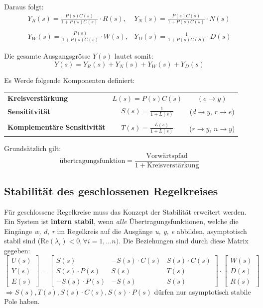     Daraus folgt: 
    \[\begin{matrix}
    Y_R(s) = \frac{P(s)C(s)}{1+P(s)C(s)}\cdot R(s), & Y_N(s) = \frac{P(s)C(s)}{1+P(s)C(s)}\cdot N(s) \\
    &\\
    Y_W(s) = \frac{P(s)}{1+P(s)C(s)}\cdot W(s), &
    Y_D(s) =  \frac{1}{1+P(s)C(S)}\cdot D(s)  

    \end{matrix}\]
    
    Die gesamte Ausgangsgrösse $Y(s)$ lautet somit:
    \[
    Y(s) = Y_R(s) + Y_N(s)+Y_W(s)+ Y_D(s)
    \]
    
    Es Werde folgende Komponenten definiert:
    
    {\renewcommand{\arraystretch}{1.5}
    \begin{tabular}{l|c|c}
    
    \textbf{Kreisverstärkung}    &$L(s)=P(s) C(s)$   & $(e\rightarrow y)$ \\
     \textbf{Sensititvität}  & $S(s) = \frac{1}{1+L(s)}$  & ($d\rightarrow y$, $r\rightarrow e$)   \\ 
     \multirow{2}{10em}{
      \textbf{Komplementäre} \textbf{Sensitivität}} & &\\& $T(s) = \frac{L(s)}{1+L(s)}$ &($r\rightarrow y$, $n\rightarrow y$)
      
        
    \end{tabular}
    }
    Grundsätzlich gilt: \[\textrm{übertragungsfunktion}=\frac{\textrm{Vorwärtspfad}}{1+\textrm{Kreisverstärkung}}\]
    
    \subsection{Stabilität des geschlossenen Regelkreises}
        Für geschlossene Regelkreise muss das Konzept der Stabilität erweitert werden. Ein System ist \textbf{intern stabil}, wenn \textit{alle} Übertragungsfunktionen, welche die Eingänge \textit{w, d, r} im Regelkreis auf die Ausgänge \textit{u, y, e} abbilden, asymptotisch stabil sind ($\textrm{Re}(\lambda_i)<0,\forall i=1,\dots n)$. Die Beziehungen sind durch diese Matrix gegeben:
        \[\begin{bmatrix}
        U(s)\\Y(s)\\E(s)
        \end{bmatrix}
        =
        \begin{bmatrix}
        S(s)    &   -S(s)\cdot C(s) &   S(s)\cdot C(s)\\
        S(s)\cdot P(s)  &   S(s)    &   T(s)\\
        -S(s)\cdot P(s) &   -S(s)   &   S(s)
        \end{bmatrix}
        \cdot
        \begin{bmatrix}
        W(s)\\D(s)\\R(s)
        \end{bmatrix}
        \]
        $\Rightarrow S(s),T(s),S(s)\cdot C(s), S(s)\cdot P(s)$ dürfen nur asymptotisch stabile Pole haben.
        

